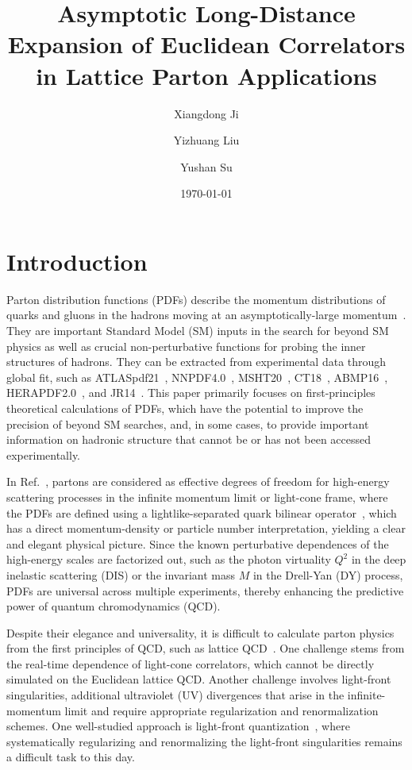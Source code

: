 \documentclass[a4paper,11pt]{article}
\title{Asymptotic Long-Distance Expansion of Euclidean Correlators in Lattice Parton Applications}
\author[a,b]{Xiangdong Ji}
\author[c]{Yizhuang Liu}
\author[b]{Yushan Su}
\affiliation[a]{T. D. Lee Institute, Shanghai 201210, China}
\affiliation[b]{Department of Physics, University of Maryland, College Park, MD 20742, USA}
\affiliation[c]{Institute of Theoretical Physics and Mark Kac Center for Complex Systems Research, Jagiellonian University, 30-348 Kraków, Poland}
\date{\today}
\begin{document}
\maketitle
\flushbottom

\section{Introduction}
Parton distribution functions (PDFs) describe the momentum distributions of quarks and gluons in the hadrons moving at an asymptotically-large  momentum~\cite{Bjorken:1969ja}. They are important Standard Model (SM) inputs in the search for beyond SM physics as well as crucial non-perturbative functions for probing the inner structures of hadrons. They can be extracted from experimental data through global fit, such as ATLASpdf21~\cite{ATLAS:2021vod}, NNPDF4.0~\cite{NNPDF:2021njg}, MSHT20~\cite{Bailey:2020ooq}, CT18~\cite{Hou:2019efy}, ABMP16~\cite{Alekhin:2017kpj}, HERAPDF2.0~\cite{H1:2015ubc}, and JR14~\cite{Jimenez-Delgado:2014twa}. This paper primarily focuses on first-principles theoretical calculations of PDFs, which have the potential to improve the precision of beyond SM searches, and, in some cases, to provide important information on hadronic structure that cannot be or has not been accessed experimentally. 

In Ref.~\cite{Ji:2024oka}, partons are considered as effective degrees of freedom for high-energy scattering processes in the infinite momentum limit or light-cone frame, where the PDFs are defined using a lightlike-separated quark bilinear operator~\cite{Collins_2023}, which has a direct momentum-density or particle number interpretation, yielding a clear and elegant physical picture. Since the known perturbative dependences of the high-energy scales are factorized out, such as the photon virtuality $Q^2$ in the deep inelastic scattering (DIS) or the invariant mass $M$ in the Drell-Yan (DY) process, PDFs are universal across multiple experiments, thereby enhancing the predictive power of quantum chromodynamics (QCD). 

Despite their elegance and universality, it is difficult to calculate parton physics from the first principles of QCD, such as lattice QCD~\cite{Wilson:1974sk}. One challenge stems from the real-time dependence of light-cone correlators, which cannot be directly simulated on the Euclidean lattice QCD. Another challenge involves light-front singularities, additional ultraviolet (UV) divergences that arise in the infinite-momentum limit and require appropriate regularization and renormalization schemes. One well-studied approach is light-front quantization~\cite{Dirac:1949cp,Brodsky:1997de}, where systematically regularizing and renormalizing the light-front singularities remains a difficult task to this day. 
\end{document}
